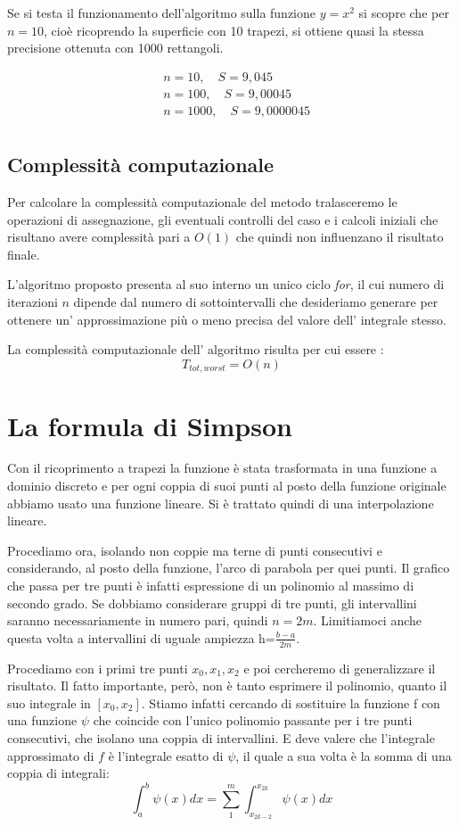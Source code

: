 \documentclass{article}
\begin{document}
Se si testa il funzionamento dell’algoritmo sulla funzione $y=x^2$ si scopre che per $n=10$, cioè ricoprendo la superficie con 10 trapezi, si ottiene quasi la stessa precisione ottenuta con 1000 rettangoli.

\begin{align*}
&n=10,\quad S=9,045\\
&n=100,\quad S=9,00045\\
&n=1000,\quad S=9,0000045\\
\end{align*}

\subsection{Complessità computazionale}
Per calcolare la complessità computazionale del metodo tralasceremo le operazioni di assegnazione, gli eventuali controlli del caso e i calcoli iniziali che risultano avere complessità pari a $O(1)$ che quindi non influenzano il risultato finale.

L'algoritmo proposto presenta al suo interno un unico ciclo \textit{for}, il cui numero di iterazioni $n$ dipende dal numero di sottointervalli che desideriamo generare per ottenere un' approssimazione più o meno precisa del valore dell' integrale stesso.

La complessità computazionale dell' algoritmo risulta per cui essere : \[T_{tot,worst} = O(n)\]

\newpage
\section{La formula di Simpson}
Con il ricoprimento a trapezi la funzione è stata trasformata in una funzione a dominio discreto e per ogni coppia di suoi punti al posto della funzione originale abbiamo usato una funzione lineare. Si è trattato quindi di una interpolazione lineare.

Procediamo ora, isolando non coppie ma terne di punti consecutivi e considerando, al posto della funzione, l’arco di parabola per quei punti. Il grafico che passa per tre punti è infatti espressione di un polinomio al massimo di secondo grado. Se dobbiamo considerare gruppi di tre punti, gli intervallini saranno necessariamente in numero pari, quindi $n=2m$. Limitiamoci anche questa volta a intervallini di uguale ampiezza h=$\frac{b-a}{2m}$.

Procediamo con i primi tre punti $x_0,x_1,x_2$ e poi cercheremo di generalizzare il risultato. Il fatto importante, però, non è tanto esprimere il polinomio, quanto il suo integrale in $[x_0,x_2]$. Stiamo infatti cercando di sostituire la funzione f con una funzione $\psi$ che coincide con l’unico polinomio passante per i tre punti consecutivi, che isolano una coppia di intervallini. E deve valere che l’integrale approssimato di $f$ è l’integrale esatto di $\psi$, il quale a sua volta è la somma di una coppia di integrali:
\[
\int_a^b\psi(x)dx=\sum_1^m\int_{x_{2k-2}}^{x_{2k}}\psi(x)dx\]
\end{document}
